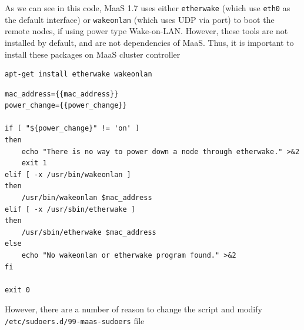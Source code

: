 As we can see in this code, MaaS 1.7 uses either \verb!etherwake! (which use
\verb!eth0! as the default interface) or \verb!wakeonlan! (which uses UDP via port) to boot the remote
nodes, if using power type Wake-on-LAN. However, these tools are not installed
by default, and are not dependencies of MaaS. Thus, it is important to install
these packages on MaaS cluster controller
\begin{verbatim}
apt-get install etherwake wakeonlan
\end{verbatim}
\begin{verbatim}
mac_address={{mac_address}}
power_change={{power_change}}

if [ "${power_change}" != 'on' ]
then
    echo "There is no way to power down a node through etherwake." >&2
    exit 1
elif [ -x /usr/bin/wakeonlan ]
then
    /usr/bin/wakeonlan $mac_address
elif [ -x /usr/sbin/etherwake ]
then
    /usr/sbin/etherwake $mac_address
else
    echo "No wakeonlan or etherwake program found." >&2
fi

exit 0
\end{verbatim}
However, there are a number of reason to change the script and modify
\verb!/etc/sudoers.d/99-maas-sudoers! file
